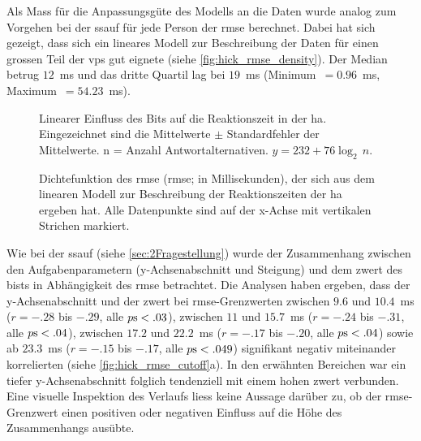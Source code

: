 \documentclass[11pt, twoside, a4paper]{book}		%
\begin{document}
Als Mass für die Anpassungsgüte des Modells an die Daten wurde analog zum Vorgehen bei der \gls{ssauf} für jede Person der \gls{rmse} berechnet. Dabei hat sich gezeigt, dass sich ein lineares Modell zur Beschreibung der Daten für einen grossen Teil der \glspl{vp} gut eignete (siehe \autoref{fig:hick_rmse_density}). Der Median betrug $12$~ms und das dritte Quartil lag bei $19$~ms (Minimum~$=0.96$~ms, Maximum~$=54.23$~ms).

\begin{figure}[t]
	\centering
	\begin{adjustbox}{width=1\textwidth}
		
	\end{adjustbox}
	\caption[Lineares Modell zur Vorhersage der Reaktionszeit durch das Bit der \gls{ha}]{Linearer Einfluss des Bits auf die Reaktionszeit in der \gls{ha}. Eingezeichnet sind die Mittelwerte $\pm$ Standardfehler der Mittelwerte. n = Anzahl Antwortalternativen. $y = 232 + 76\log_{2}\,n$.}
	\label{fig:hick_linear_model}
\end{figure}

\begin{figure}[t]
	\centering
	\begin{adjustbox}{width=1\textwidth}
		
	\end{adjustbox}
	\caption[Dichtefunktion des aus der \gls{ha} mit einer linearen Regression abgeleiteten \gls{rmse}]{Dichtefunktion des \acrlong{rmse} (\gls{rmse}; in Millisekunden), der sich aus dem linearen Modell zur Beschreibung der Reaktionszeiten der \gls{ha} ergeben hat. Alle Datenpunkte sind auf der x-Achse mit vertikalen Strichen markiert.}
	\label{fig:hick_rmse_density}
\end{figure}

Wie bei der \gls{ssauf} (siehe \autoref{sec:2Fragestellung}) wurde der Zusammenhang zwischen den Aufgabenparametern (y-Ach\-sen\-ab\-schnitt und Steigung) und dem \gls{zwert} des \gls{bist}s in Abhängigkeit des \gls{rmse} betrachtet. Die Analysen haben ergeben, dass der y-Ach\-sen\-ab\-schnitt und der \gls{zwert} bei \gls{rmse}-Grenzwerten zwischen $9.6$ und $10.4$~ms ($r = -.28$ bis $ -.29$, alle $p\textnormal{s} < .03$), zwischen $11$ und $15.7$~ms ($r = -.24$ bis $ -.31$, alle $p\textnormal{s} < .04$), zwischen $17.2$ und $22.2$~ms ($r = -.17$ bis $ -.20$, alle $p\textnormal{s} < .04$) sowie ab $23.3$~ms ($r = -.15$ bis $ -.17$, alle $p\textnormal{s} < .049$) signifikant negativ miteinander korrelierten (siehe \autoref{fig:hick_rmse_cutoff}a). In den erwähnten Bereichen war ein tiefer y-Ach\-sen\-ab\-schnitt folglich tendenziell mit einem hohen \gls{zwert} verbunden. Eine visuelle Inspektion des Verlaufs liess keine Aussage darüber zu, ob der \gls{rmse}-Grenzwert einen positiven oder negativen Einfluss auf die Höhe des Zusammenhangs ausübte.
\end{document}
